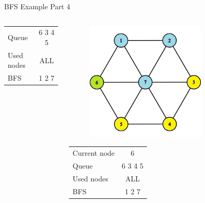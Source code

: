 \documentclass[aspectratio=169]{beamer}%
\begin{document}
\begin{frame}{BFS Example Part 4}
\begin{columns}
\begin{column}{0.32\textwidth}
\begin{table}[ht]
\begin{tabular}{l c}
                    Queue & 6 3 4 5\\ 
                    Used nodes & ALL\\
                    BFS & 1 2 7
                \end{tabular}
            \end{table}
        \end{column}
        \hfill
        \begin{column}{0.32\textwidth}
            \begin{figure}[!ht]
                \centering
                \includegraphics[width=0.9\linewidth]{bfs 11.png}
            \end{figure}
            \begin{table}[ht]
                \centering
                \begin{tabular}{l c}
                    Current node & 6\\
                    Queue & 6 3 4 5 \\ 
                    Used nodes & ALL\\
                    BFS & 1 2 7
                \end{tabular}
            \end{table}
        \end{column}
        \hfill
        \begin{column}{0.32\textwidth}
            \begin{figure}[!ht]

\end{figure}
\end{column}
\end{columns}
\end{frame}
\end{document}
